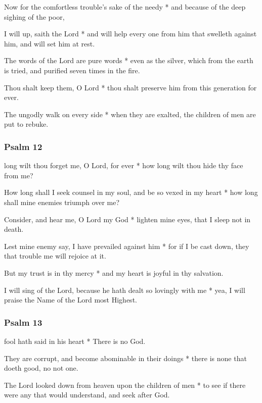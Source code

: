 Now for the comfortless trouble's sake of the needy * and because of the deep sighing of the poor,

I will up, saith the Lord * and will help every one from him that swelleth against him, and will set him at rest.

The words of the Lord are pure words * even as the silver, which from the earth is tried, and purified seven times in the fire.

Thou shalt keep them, O Lord * thou shalt preserve him from this generation for ever.

The ungodly walk on every side * when they are exalted, the children of men are put to rebuke.

\subsubsection{Psalm 12}


 long wilt thou forget me, O Lord, for ever * how long wilt thou hide thy face from me?

How long shall I seek counsel in my soul, and be so vexed in my heart * how long shall mine enemies triumph over me?

Consider, and hear me, O Lord my God * lighten mine eyes, that I sleep not in death.

Lest mine enemy say, I have prevailed against him * for if I be cast down, they that trouble me will rejoice at it.

But my trust is in thy mercy * and my heart is joyful in thy salvation.

I will sing of the Lord, because he hath dealt so lovingly with me * yea, I will praise the Name of the Lord most Highest.

\subsubsection{Psalm 13}


 fool hath said in his heart * There is no God.

They are corrupt, and become abominable in their doings * there is none that doeth good, no not one.

The Lord looked down from heaven upon the children of men * to see if there were any that would understand, and seek after God.

